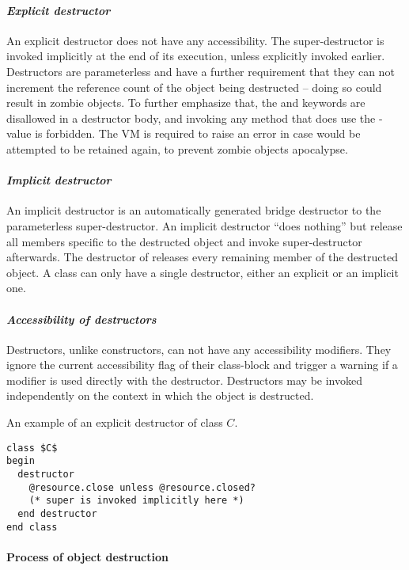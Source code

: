 \paragraph{\em Explicit destructor}
An explicit destructor does not have any accessibility. The super-destructor is invoked implicitly at the end of its execution, unless explicitly invoked earlier. Destructors are parameterless and have a further requirement that they can not increment the reference count of the object being destructed -- doing so could result in zombie objects. To further emphasize that, the  and  keywords are disallowed in a destructor body, and invoking any method that does use the -value is forbidden. The VM is required to raise an error in case  would be attempted to be retained again, to prevent zombie objects apocalypse. 

\paragraph{\em Implicit destructor}
An implicit destructor is an automatically generated bridge destructor to the parameterless super-destructor. An implicit destructor ``does nothing'' but release all members specific to the destructed object and invoke super-destructor afterwards. The destructor of  releases every remaining member of the destructed object. A class can only have a single destructor, either an explicit or an implicit one. 

\paragraph{\em Accessibility of destructors}
Destructors, unlike constructors, can not have any accessibility modifiers. They ignore the current accessibility flag of their class-block and trigger a warning if a modifier is used directly with the destructor. Destructors may be invoked independently on the context in which the object is destructed. 

\example An example of an explicit destructor of class $C$. 
\begin{lstlisting}
class $C$
begin
  destructor
    @resource.close unless @resource.closed?
    (* super is invoked implicitly here *)
  end destructor
end class
\end{lstlisting}

\paragraph{Process of object destruction}

